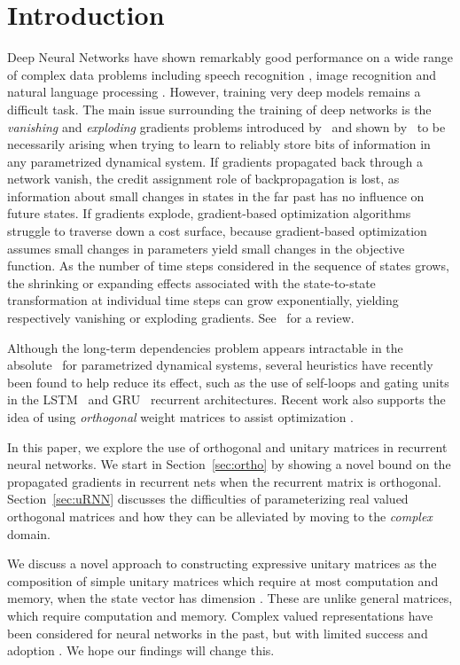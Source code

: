 \documentclass{article}
\begin{document}
\section{Introduction}
Deep Neural Networks have shown remarkably good performance on a wide range of complex data problems 
including speech recognition \citep{Hinton2012}, image recognition \citep{Krizhevsky2012} and natural 
language processing \citep{Collobert2011}. However, training very deep models remains a difficult task. 
The main issue surrounding the 
training of deep networks is the {\it{vanishing}} and {\it{exploding}} gradients problems
introduced by~\citet{Hochreiter91-small} and shown by~\citet{Yoshua94} to be necessarily arising when trying to learn
to reliably store bits of information in any parametrized dynamical system.
If gradients propagated back through a network vanish, the credit assignment role of backpropagation
is lost, as information about small changes in states in the far past has no influence on future states.
If gradients explode, gradient-based optimization algorithms struggle to 
traverse down a cost surface, because gradient-based optimization assumes small changes in parameters
yield small changes in the objective function.
As the number of time steps
considered in the sequence of states grows, the shrinking or expanding effects associated with the state-to-state
transformation at individual time steps can grow exponentially, yielding respectively vanishing or exploding
gradients. See~\citet{Pascanu2013} for a review.

Although the long-term dependencies problem appears intractable in the absolute~\citep{Yoshua94} for
parametrized dynamical systems, several heuristics have recently been found to help 
reduce its effect, such as the use of self-loops and gating units in the LSTM~\citep{LSTM}
and GRU~\citep{Cho2014a} recurrent architectures.
Recent work also supports the idea of using \textit{orthogonal} weight matrices to assist optimization  
\citep{Saxe2014, Quoc2015}.


In this paper, we explore the use of orthogonal and unitary matrices in recurrent neural networks.
We start in Section~\ref{sec:ortho} by showing a novel bound on the propagated gradients
in recurrent nets when the recurrent matrix is orthogonal.
Section~\ref{sec:uRNN} discusses the difficulties of parameterizing real valued orthogonal matrices and how
they can be alleviated by moving to the \textit{complex} domain. 

We discuss a novel approach to constructing expressive unitary matrices as the composition of simple
unitary matrices which require at most  computation and  memory,
when the state vector has dimension . These are
unlike general matrices, which require  computation and memory. 
Complex valued representations have been considered for neural networks in the past, 
but with limited success and adoption \citep{hirose2003complex, zimmermann2011comparison}. 
We hope our findings will change this.
\end{document}
